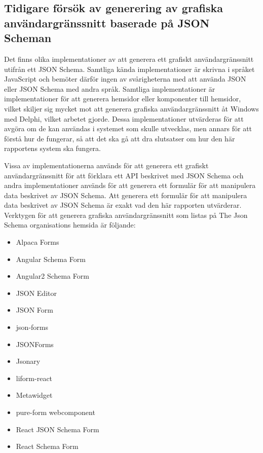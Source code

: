 \subsection{Tidigare försök av generering av grafiska användargränssnitt baserade på JSON Scheman}
\label{sec:teori:schema-användningsområden:ui-generering}
Det finns olika implementationer av att generera ett grafiskt användargränssnitt utifrån ett JSON Schema. Samtliga kända implementationer är skrivna i språket JavaScript och bemöter därför ingen av svårigheterna med att använda JSON eller JSON Schema med andra språk. Samtliga implementationer är implementationer för att generera hemsidor eller komponenter till hemsidor, vilket skiljer sig mycket mot att generera grafiska användargränssnitt åt Windows med Delphi, vilket arbetet gjorde. Dessa implementationer utvärderas för att avgöra om de kan användas i systemet som skulle utvecklas, men annars för att förstå hur de fungerar, så att det ska gå att dra slutsatser om hur den här rapportens system ska fungera.

Vissa av implementationerna används för att generera ett grafiskt användargränssnitt för att förklara ett API beskrivet med JSON Schema och andra implementationer används för att generera ett formulär för att manipulera data beskrivet av JSON Schema. Att generera ett formulär för att manipulera data beskrivet av JSON Schema är exakt vad den här rapporten utvärderar. Verktygen för att generera grafiska användargränssnitt som listas på The Json Schema organisations hemsida är följande:

\begin{itemize}
	\item Alpaca Forms \cite{GitanaSoftwareInc.}
	\item Angular Schema Form \cite{Textalk}
	\item Angular2 Schema Form \cite{MakinaCorpus}
	\item JSON Editor \cite{JeremyDorn}
	\item JSON Form \cite{Joshfire}
	\item json-forms \cite{Brutusin.org}
	\item JSONForms  \cite{EclipseSource}
	\item Jsonary \cite{Jsonary-js}
	\item liform-react \cite{NachoMartin}
	\item Metawidget \cite{Metawidget}
	\item pure-form webcomponent
	\item React JSON Schema Form \cite{MozillaServices}
	\item React Schema Form \cite{NetworkNewTechnologiesInc.}
\end{itemize}